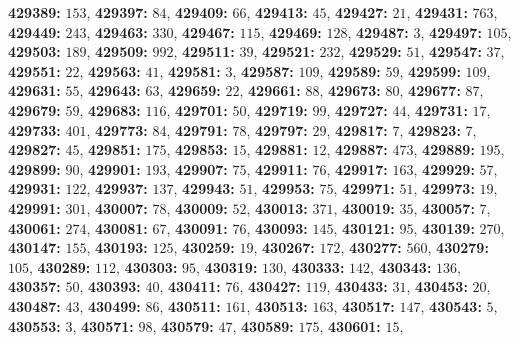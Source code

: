 \textsf{\bfseries 429389:} $153$, \textsf{\bfseries 429397:} $84$, \textsf{\bfseries 429409:} $66$, \textsf{\bfseries 429413:} $45$, \textsf{\bfseries 429427:} $21$, \textsf{\bfseries 429431:} $763$, \textsf{\bfseries 429449:} $243$, \textsf{\bfseries 429463:} $330$, \textsf{\bfseries 429467:} $115$, \textsf{\bfseries 429469:} $128$, \textsf{\bfseries 429487:} $3$, \textsf{\bfseries 429497:} $105$, \textsf{\bfseries 429503:} $189$, \textsf{\bfseries 429509:} $992$, \textsf{\bfseries 429511:} $39$, \textsf{\bfseries 429521:} $232$, \textsf{\bfseries 429529:} $51$, \textsf{\bfseries 429547:} $37$, \textsf{\bfseries 429551:} $22$, \textsf{\bfseries 429563:} $41$, \textsf{\bfseries 429581:} $3$, \textsf{\bfseries 429587:} $109$, \textsf{\bfseries 429589:} $59$, \textsf{\bfseries 429599:} $109$, \textsf{\bfseries 429631:} $55$, \textsf{\bfseries 429643:} $63$, \textsf{\bfseries 429659:} $22$, \textsf{\bfseries 429661:} $88$, \textsf{\bfseries 429673:} $80$, \textsf{\bfseries 429677:} $87$, \textsf{\bfseries 429679:} $59$, \textsf{\bfseries 429683:} $116$, \textsf{\bfseries 429701:} $50$, \textsf{\bfseries 429719:} $99$, \textsf{\bfseries 429727:} $44$, \textsf{\bfseries 429731:} $17$, \textsf{\bfseries 429733:} $401$, \textsf{\bfseries 429773:} $84$, \textsf{\bfseries 429791:} $78$, \textsf{\bfseries 429797:} $29$, \textsf{\bfseries 429817:} $7$, \textsf{\bfseries 429823:} $7$, \textsf{\bfseries 429827:} $45$, \textsf{\bfseries 429851:} $175$, \textsf{\bfseries 429853:} $15$, \textsf{\bfseries 429881:} $12$, \textsf{\bfseries 429887:} $473$, \textsf{\bfseries 429889:} $195$, \textsf{\bfseries 429899:} $90$, \textsf{\bfseries 429901:} $193$, \textsf{\bfseries 429907:} $75$, \textsf{\bfseries 429911:} $76$, \textsf{\bfseries 429917:} $163$, \textsf{\bfseries 429929:} $57$, \textsf{\bfseries 429931:} $122$, \textsf{\bfseries 429937:} $137$, \textsf{\bfseries 429943:} $51$, \textsf{\bfseries 429953:} $75$, \textsf{\bfseries 429971:} $51$, \textsf{\bfseries 429973:} $19$, \textsf{\bfseries 429991:} $301$, \textsf{\bfseries 430007:} $78$, \textsf{\bfseries 430009:} $52$, \textsf{\bfseries 430013:} $371$, \textsf{\bfseries 430019:} $35$, \textsf{\bfseries 430057:} $7$, \textsf{\bfseries 430061:} $274$, \textsf{\bfseries 430081:} $67$, \textsf{\bfseries 430091:} $76$, \textsf{\bfseries 430093:} $145$, \textsf{\bfseries 430121:} $95$, \textsf{\bfseries 430139:} $270$, \textsf{\bfseries 430147:} $155$, \textsf{\bfseries 430193:} $125$, \textsf{\bfseries 430259:} $19$, \textsf{\bfseries 430267:} $172$, \textsf{\bfseries 430277:} $560$, \textsf{\bfseries 430279:} $105$, \textsf{\bfseries 430289:} $112$, \textsf{\bfseries 430303:} $95$, \textsf{\bfseries 430319:} $130$, \textsf{\bfseries 430333:} $142$, \textsf{\bfseries 430343:} $136$, \textsf{\bfseries 430357:} $50$, \textsf{\bfseries 430393:} $40$, \textsf{\bfseries 430411:} $76$, \textsf{\bfseries 430427:} $119$, \textsf{\bfseries 430433:} $31$, \textsf{\bfseries 430453:} $20$, \textsf{\bfseries 430487:} $43$, \textsf{\bfseries 430499:} $86$, \textsf{\bfseries 430511:} $161$, \textsf{\bfseries 430513:} $163$, \textsf{\bfseries 430517:} $147$, \textsf{\bfseries 430543:} $5$, \textsf{\bfseries 430553:} $3$, \textsf{\bfseries 430571:} $98$, \textsf{\bfseries 430579:} $47$, \textsf{\bfseries 430589:} $175$, \textsf{\bfseries 430601:} $15$, 
